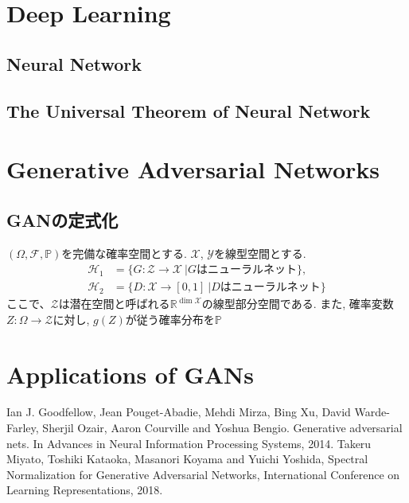 \documentclass[11pt, a4paper, dvipdfmx]{jsarticle}
\theoremstyle{definition}
\newcommand{\R}{\mathbb{R}}
\newcommand{\F}{\mathcal{F}}
\newcommand{\X}{\mathcal{X}}
\newcommand{\Y}{\mathcal{Y}}
\newcommand{\Hil}{\mathcal{H}}
\renewcommand{\P}{\mathbb{P}}
\newcommand{\Probsp}{(\Omega, \F, \P)}
\begin{document}
\section{Deep Learning}
\subsection{Neural Network}
\subsection{The Universal Theorem of Neural Network}
\section{Generative Adversarial Networks}
\subsection{GANの定式化}
$\Probsp$を完備な確率空間とする.  
$\X$, $\Y$を線型空間とする. 
\begin{align*}
    \Hil_1 &= \{G:\mathcal{Z}\to\X~| G\text{はニューラルネット}\},\\
    \Hil_{2} &= \{D:\X\to [0, 1]~| D\text{はニューラルネット}\}
\end{align*}
ここで、$\mathcal{Z}$は潜在空間と呼ばれる$\R^{\dim\X}$の線型部分空間である.
また, 確率変数$Z:\Omega\to\mathcal{Z}$に対し, $g(Z)$が従う確率分布を$\mathbb{P}_{}$
\section{Applications of GANs}

\begin{thebibliography}{20}
     Ian J. Goodfellow, Jean Pouget-Abadie, Mehdi Mirza, Bing Xu, David Warde-Farley, Sherjil Ozair, Aaron Courville and Yoshua Bengio. 
    Generative adversarial nets. In Advances in Neural Information Processing Systems, 2014.
    Takeru Miyato, Toshiki Kataoka, Masanori Koyama and Yuichi Yoshida, Spectral Normalization for Generative Adversarial Networks, 
    International Conference on Learning Representations, 2018.
\end{thebibliography}
\end{document}
